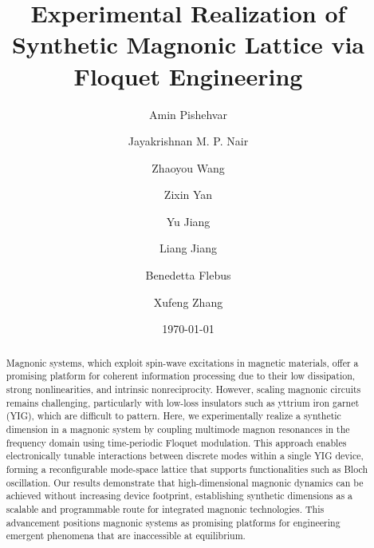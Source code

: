 \documentclass[
twocolumn,

superscriptaddress,









 amsmath,amssymb,
 aps,


prl,




]{revtex4-2}
\begin{document}



\title{Experimental Realization of Synthetic Magnonic Lattice via Floquet Engineering}



\author{Amin Pishehvar}

\author{Jayakrishnan M. P. Nair}


\author{Zhaoyou Wang}


\author{Zixin Yan}

\author{Yu Jiang}



\author{Liang Jiang}


\author{Benedetta Flebus}


\author{Xufeng Zhang}



\date{\today}






\begin{abstract}
Magnonic systems, which exploit spin-wave excitations in magnetic materials, offer a promising platform for coherent information processing due to their low dissipation, strong nonlinearities, and intrinsic nonreciprocity. However, scaling magnonic circuits remains challenging, particularly with low-loss insulators such as yttrium iron garnet (YIG), which are difficult to pattern. Here, we experimentally realize a synthetic dimension in a magnonic system by coupling multimode magnon resonances in the frequency domain using time-periodic Floquet modulation. This approach enables electronically tunable interactions between discrete modes within a single YIG device, forming a reconfigurable mode-space lattice that supports functionalities such as Bloch oscillation. Our results demonstrate that high-dimensional magnonic dynamics can be achieved without increasing device footprint, establishing synthetic dimensions as a scalable and programmable route for integrated magnonic technologies. This advancement positions magnonic systems as promising platforms for engineering emergent phenomena that are inaccessible at equilibrium.
\end{abstract}
\end{document}

